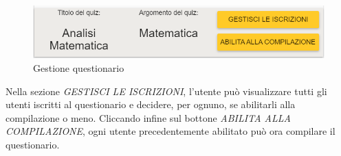 \label{GestioneQuestionario}
\begin{figure}[ht]
	\centering
	\includegraphics[scale=0.55]{img/gestione_questionario.png}
	\caption{Gestione questionario}
\end{figure}
\FloatBarrier

Nella sezione \textit{GESTISCI LE ISCRIZIONI}, l'utente può visualizzare tutti gli utenti iscritti al questionario e decidere, per ognuno, se abilitarli alla compilazione o meno. Cliccando infine sul bottone \textit{ABILITA ALLA COMPILAZIONE}, ogni utente precedentemente abilitato può ora compilare il questionario. 

